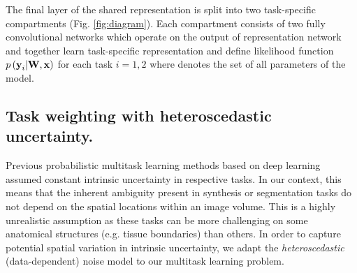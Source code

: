 The final layer of the shared representation is split into two task-specific compartments (Fig. \ref{fig:diagram}). Each compartment consists of two fully convolutional networks which operate on the output of representation network and together learn task-specific representation and define likelihood function $p\left(\text{\textbf{y}}_{i}|\text{\textbf{W}},\textbf{x}\right)$ for each task $i=1, 2$ where  denotes the set of all parameters of the model. 

\subsection{Task weighting with heteroscedastic uncertainty.}
Previous probabilistic multitask learning methods based on deep learning \cite{kendall2017multi} assumed constant intrinsic uncertainty in respective tasks. In our context, this means that the inherent ambiguity present in synthesis or segmentation tasks do not depend on the spatial locations within an image volume. This is a highly unrealistic assumption as these tasks can be more challenging on some anatomical structures (e.g. tissue boundaries) than others. In order to capture potential spatial variation in intrinsic uncertainty, we adapt the \emph{heteroscedastic} (data-dependent) noise model to our multitask learning problem.   

